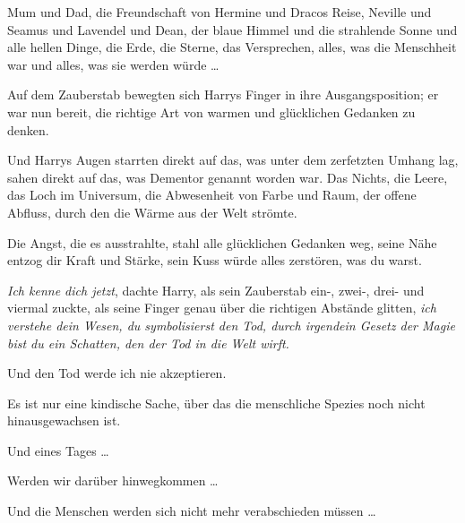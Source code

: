 Mum und Dad, die Freundschaft von Hermine und Dracos Reise, Neville und Seamus und Lavendel und Dean, der blaue Himmel und die strahlende Sonne und alle hellen Dinge, die Erde, die Sterne, das Versprechen, alles, was die Menschheit war und alles, was sie werden würde …

Auf dem Zauberstab bewegten sich Harrys Finger in ihre Ausgangsposition; er war nun bereit, die richtige Art von warmen und glücklichen Gedanken zu denken.

Und Harrys Augen starrten direkt auf das, was unter dem zerfetzten Umhang lag, sahen direkt auf das, was Dementor genannt worden war. Das Nichts, die Leere, das Loch im Universum, die Abwesenheit von Farbe und Raum, der offene Abfluss, durch den die Wärme aus der Welt strömte.

Die Angst, die es ausstrahlte, stahl alle glücklichen Gedanken weg, seine Nähe entzog dir Kraft und Stärke, sein Kuss würde alles zerstören, was du warst.

\emph{Ich kenne dich jetzt}, dachte Harry, als sein Zauberstab ein-, zwei-, drei- und viermal zuckte, als seine Finger genau über die richtigen Abstände glitten, \emph{ich verstehe dein Wesen, du symbolisierst den Tod, durch irgendein Gesetz der Magie bist du ein Schatten, den der Tod in die Welt wirft.}

\begin{em}
Und den Tod werde ich nie akzeptieren.

Es ist nur eine kindische Sache, über das die menschliche Spezies noch nicht hinausgewachsen ist.

Und eines Tages …

Werden wir darüber hinwegkommen …

Und die Menschen werden sich nicht mehr verabschieden müssen …
\end{em}

